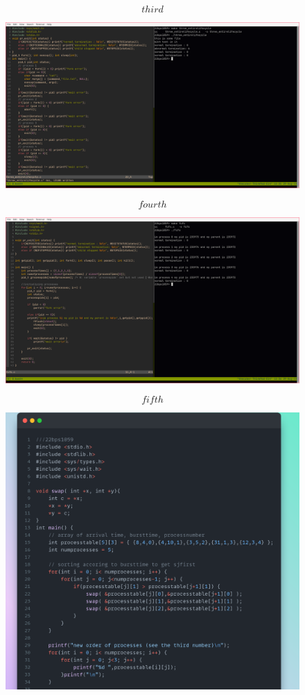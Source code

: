 \documentclass{article}
\begin{document}
   \begin{figure}[htbp]
        $$third$$
       \centerline{ \includegraphics[width=1.5\linewidth]{fig3.png} }
        $$fourth$$
       \centerline{ \includegraphics[width=1.5\linewidth]{fig4.png} }
   \end{figure}

   \begin{figure}[htbp]
        $$fifth$$
       \centerline{ \includegraphics[width=1.5\linewidth]{fig5.png} }
   \end{figure}
\end{document}
